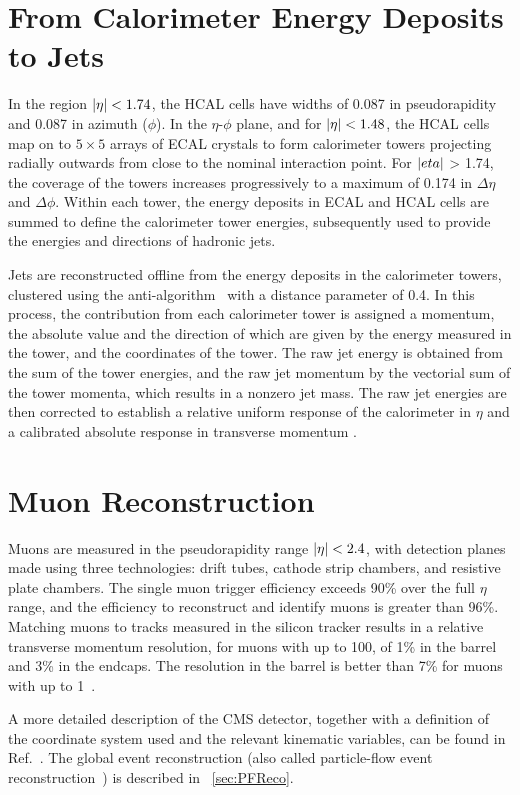  \section{From Calorimeter Energy Deposits to Jets}\label{sec:CMSDetectorJets}

In the region $\lvert \eta \rvert < 1.74$, the HCAL cells have widths of 0.087 in pseudorapidity and 0.087 in azimuth ($\phi$). In the $\eta$-$\phi$ plane, and for $\lvert \eta \rvert < 1.48$, the HCAL cells map on to $5 \times 5$ arrays of ECAL crystals to form calorimeter towers projecting radially outwards from close to the nominal interaction point. For $\lvert  eta  \rvert$ > 1.74, the coverage of the towers increases progressively to a maximum of 0.174 in $\Delta \eta$ and $\Delta \phi$. Within each tower, the energy deposits in ECAL and HCAL cells are summed to define the calorimeter tower energies, subsequently used to provide the energies and directions of hadronic jets.

Jets are reconstructed offline from the energy deposits in the calorimeter towers, clustered using the anti-\kt algorithm~\cite{Cacciari:2008gp, Cacciari:2011ma} with a distance parameter of 0.4. In this process, the contribution from each calorimeter tower is assigned a momentum, the absolute value and the direction of which are given by the energy measured in the tower, and the coordinates of the tower. The raw jet energy is obtained from the sum of the tower energies, and the raw jet momentum by the vectorial sum of the tower momenta, which results in a nonzero jet mass. The raw jet energies are then corrected to establish a relative uniform response of the calorimeter in $\eta$ and a calibrated absolute response in transverse momentum \pt. 


 \section{Muon Reconstruction}\label{sec:CMSDetectorMuons}


Muons are measured in the pseudorapidity range $\lvert \eta \rvert < 2.4$, with detection planes made using three technologies: drift tubes, cathode strip chambers, and resistive plate chambers. The single muon trigger efficiency exceeds 90\% over the full $\eta$ range, and the efficiency to reconstruct and identify muons is greater than 96\%. Matching muons to tracks measured in the silicon tracker results in a relative transverse momentum resolution, for muons with \pt up to 100\GeV, of 1\% in the barrel and 3\% in the endcaps. The \pt resolution in the barrel is better than 7\% for muons with \pt up to 1\TeV~\cite{Sirunyan:2018fpa}. 


A more detailed description of the CMS detector, together with a definition of the coordinate system used and the relevant kinematic variables, can be found in Ref.~\cite{Chatrchyan:2008zzk}.  The global event reconstruction (also called particle-flow event reconstruction~\cite{CMS-PRF-14-001}) is described in ~\ref{sec:PFReco}.


